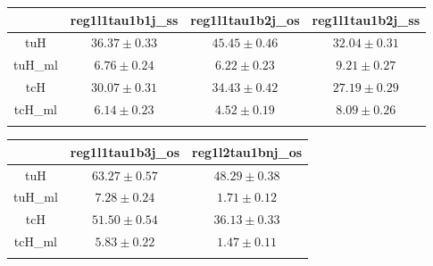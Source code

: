 \centering
\begin{tabular}{cccc} \toprule\toprule
 & reg1l1tau1b1j\_ss & reg1l1tau1b2j\_os & reg1l1tau1b2j\_ss\\\midrule
tuH & $36.37\pm0.33$ & $45.45\pm0.46$ & $32.04\pm0.31$\\
tuH\_ml & $6.76\pm0.24$ & $6.22\pm0.23$ & $9.21\pm0.27$\\
tcH & $30.07\pm0.31$ & $34.43\pm0.42$ & $27.19\pm0.29$\\
tcH\_ml & $6.14\pm0.23$ & $4.52\pm0.19$ & $8.09\pm0.26$\\
\bottomrule\bottomrule\\
\end{tabular}
\begin{tabular}{ccc} \toprule\toprule
 & reg1l1tau1b3j\_os & reg1l2tau1bnj\_os\\\midrule
tuH & $63.27\pm0.57$ & $48.29\pm0.38$\\
tuH\_ml & $7.28\pm0.24$ & $1.71\pm0.12$\\
tcH & $51.50\pm0.54$ & $36.13\pm0.33$\\
tcH\_ml & $5.83\pm0.22$ & $1.47\pm0.11$\\
\bottomrule\bottomrule\\
\end{tabular}
